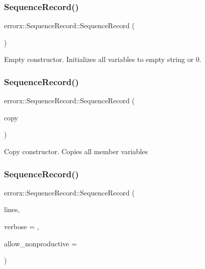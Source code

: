 \subsubsection{\texorpdfstring{Sequence\+Record()}{SequenceRecord()}\hspace{0.1cm}{\footnotesize\ttfamily [1/4]}}
{\footnotesize\ttfamily errorx\+::\+Sequence\+Record\+::\+Sequence\+Record (\begin{DoxyParamCaption}{ }\end{DoxyParamCaption})}

Empty constructor. Initializes all variables to empty string or 0. \mbox{\label{classerrorx_1_1_sequence_record_a659615c7179fdaaaed5196cc37f93623}} 
\subsubsection{\texorpdfstring{Sequence\+Record()}{SequenceRecord()}\hspace{0.1cm}{\footnotesize\ttfamily [2/4]}}
{\footnotesize\ttfamily errorx\+::\+Sequence\+Record\+::\+Sequence\+Record (\begin{DoxyParamCaption}\item[{\mbox{\hyperlink{classerrorx_1_1_sequence_record}{Sequence\+Record}} const \&}]{copy }\end{DoxyParamCaption})}

Copy constructor. Copies all member variables \mbox{\label{classerrorx_1_1_sequence_record_ac20b7a31e542e34795be7a0450e6d103}} 
\subsubsection{\texorpdfstring{Sequence\+Record()}{SequenceRecord()}\hspace{0.1cm}{\footnotesize\ttfamily [3/4]}}
{\footnotesize\ttfamily errorx\+::\+Sequence\+Record\+::\+Sequence\+Record (\begin{DoxyParamCaption}\item[{vector$<$ string $>$ const \&}]{lines,  }\item[{int}]{verbose = {},  }\item[{bool}]{allow\+\_\+nonproductive = {} }\end{DoxyParamCaption})}

